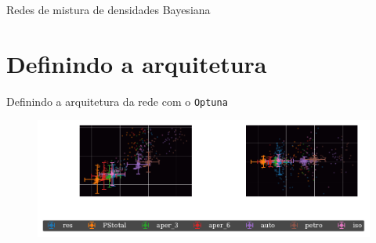 \begin{frame}[c]{Redes de mistura de densidades Bayesiana}
\end{frame}

\section{Definindo a arquitetura}
\begin{frame}[c]{Definindo a arquitetura da rede com o \texttt{Optuna}}
    \begin{figure}
        \centering
        \includegraphics[width=\linewidth]{script/images/optuna_metrics_scatter.pdf}
    \end{figure}
\end{frame}

